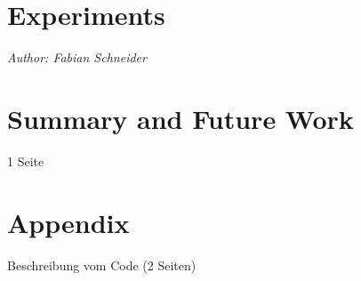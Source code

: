 \documentclass[
     12pt,         %
     a4paper,      %
     DIV=14,        %
     ]{scrreprt}
\begin{document}
\chapter{Experiments}
\label{chap:experiments}
\textit{Author: Fabian Schneider}


\chapter{Summary and Future Work}
\label{chap:summary}
1 Seite


\chapter{Appendix}
\label{chap:appendix}
Beschreibung vom Code (2 Seiten)












\end{document}
